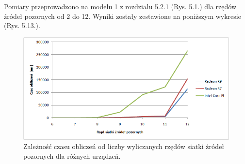 Pomiary przeprowadzono na modelu 1 z rozdziału 5.2.1 (Rys. 5.1.) dla rzędów źródeł pozornych od 2 do 12. Wyniki zostały zestawione na poniższym wykresie (Rys. 5.13.).

\begin{figure}[h]
        \centering
                \centering
                \includegraphics[width=12cm]{wykres}
	\caption{Zależność czasu obliczeń od liczby wyliczanych rzędów siatki źródeł pozornych dla różnych urządzeń.}
\end{figure}
















